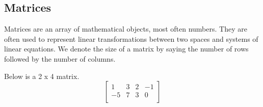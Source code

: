 \subsection{Matrices}
\noindent
Matrices are an array of mathematical objects, most often numbers.
They are often used to represent linear transformations between two spaces and systems of linear equations.
We denote the size of a matrix by saying the number of rows followed by the number of columns.

\begin{example}
	Below is a 2 x 4 matrix.
	\begin{equation*}
		\begin{bmatrix}
			1 & 3 & 2 & -1 \\
			-5 & 7 & 3 & 0 \\
		\end{bmatrix}
	\end{equation*}
\end{example}




